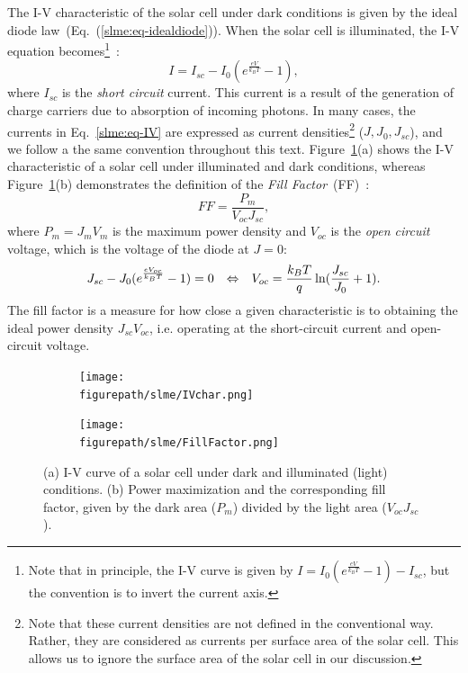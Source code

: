 \begin{refsection}
The I-V characteristic of the solar cell under dark conditions is given by the 
ideal diode law~(Eq.~(\ref{slme:eq-idealdiode})). When the solar cell is 
illuminated, the I-V equation becomes\footnote{Note that in principle, the I-V 
curve is given by $I = I_0 (e^\frac{e V}{k_B T} - 1) - I_{sc}$, but the 
convention is to invert the current axis.}~\cite{Lindholm1979}: 
\begin{equation}\label{slme:eq-IV} 
I = I_{sc} - I_0 (e^\frac{e V}{k_B T} - 1), 
\end{equation} 
where $I_{sc}$ is the \textit{short circuit} current. This current is a result 
of the generation of charge carriers due to absorption of incoming photons. In 
many cases, the currents in Eq.~\ref{slme:eq-IV} are expressed as current 
densities\footnote{Note that these current densities are not defined in the 
conventional way. Rather, they are considered as currents per surface area of 
the solar cell. This allows us to ignore the surface area of the solar cell in 
our discussion.} ($J,J_0,J_{sc}$), and we follow a the same convention 
throughout this text. Figure~\ref{slme:fig-IV_char}(a) shows the I-V 
characteristic of a solar cell under illuminated and dark conditions, whereas 
Figure~\ref{slme:fig-IV_char}(b) demonstrates the definition of the 
\textit{Fill Factor}~(FF)~\cite{Fonash2010}: 
\begin{equation} 
FF = \frac{P_{m}}{V_{oc} J_{sc}}, 
\end{equation} 
where $P_m = J_m V_m$ is the maximum power density and $V_{oc}$ is the 
\textit{open circuit} voltage, which is the voltage of the diode at $J = 0$: 
\begin{equation} 
J_{sc} - J_0 (e^\frac{eV_{oc}}{k_B T}-1) = 0 \hspace{0.1in} \Leftrightarrow 
\hspace{0.1in} V_{oc} = \frac{k_B T}{q} \ln (\frac{J_{sc}}{J_0} + 1). 
\end{equation} 
The fill factor is a measure for how close a given characteristic is to 
obtaining the ideal power density $J_{sc}V_{oc}$, i.e. operating at the 
short-circuit current and open-circuit voltage. 
 
\begin{figure}[ht]  
\centering 
\begin{subfigure}{0.5\textwidth} 
\centering 
\texttt{[image: \\figurepath/slme/IVchar.png]} 
\caption{} 
\end{subfigure}%
\begin{subfigure}{0.5\textwidth} 
\centering 
\texttt{[image: \\figurepath/slme/FillFactor.png]} 
\caption{} 
\end{subfigure} 
\caption{\label{slme:fig-IV_char} (a) I-V curve of a solar cell under dark and 
illuminated (light) conditions. (b) Power maximization and the corresponding 
fill factor, given by the dark area ($P_m$) divided by the light area ($V_{oc} 
J_{sc}$).} 
\end{figure} 
 

\end{refsection}
